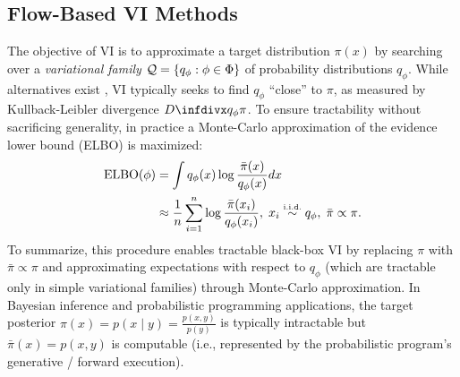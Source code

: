 \documentclass[../../thesis.tex]{subfiles}
\begin{document}
\subsection{Flow-Based VI Methods}

The objective of VI is to approximate a target distribution $\pi(x)$ by searching over
a \emph{variational family} $\mathcal{Q} = \{q_\phi : \phi \in \Phi\}$ of probability distributions $q_\phi$.
While alternatives exist \citep{li2016variational,wang2018variational}, VI typically
seeks to find $q_\phi$ ``close'' to $\pi$, as measured by Kullback-Leibler divergence $\infdiv{q_\phi}{\pi}$.
To ensure tractability without sacrificing generality, in practice \citep{wingate2013automated,ranganath2014black}
a Monte-Carlo approximation of the evidence lower bound (ELBO) is maximized:
\begin{align*}
  \text{ELBO}(\phi)
   & = \int q_\phi(x) \log \frac{\bar\pi(x)}{q_\phi(x)} dx                     \\
   & \approx \frac{1}{n} \sum_{i=1}^n \log \frac{\bar\pi(x_i)}{q_\phi(x_i)},\;
  x_i \simiid q_\phi,\;
  \bar{\pi} \propto \pi.
\end{align*}
To summarize, this procedure enables tractable black-box VI
by replacing $\pi$ with $\bar\pi \propto \pi$ and approximating expectations with respect to $q_\phi$ (which are tractable only in simple variational families) through Monte-Carlo approximation. In Bayesian inference and probabilistic programming applications, the target posterior
$\pi(x) = p(x \mid y) = \frac{p(x, y)}{p(y)}$ is typically intractable but
$\bar\pi(x) = p(x,y)$ is computable (i.e., represented by the probabilistic program's
generative / forward execution).
\end{document}
